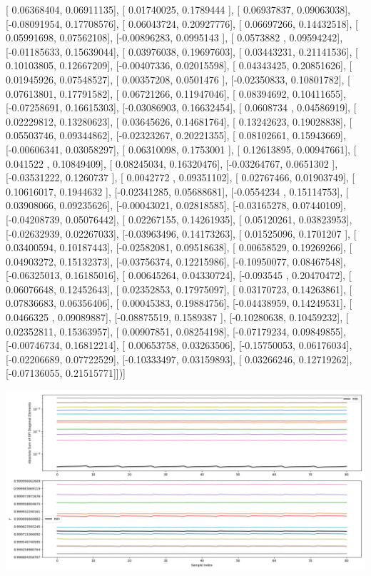 \documentclass{article}
\begin{document}
       [ 0.06368404,  0.06911135],
       [ 0.01740025,  0.1789444 ],
       [ 0.06937837,  0.09063038],
       [-0.08091954,  0.17708576],
       [ 0.06043724,  0.20927776],
       [ 0.06697266,  0.14432518],
       [ 0.05991698,  0.07562108],
       [-0.00896283,  0.0995143 ],
       [ 0.0573882 ,  0.09594242],
       [-0.01185633,  0.15639044],
       [ 0.03976038,  0.19697603],
       [ 0.03443231,  0.21141536],
       [ 0.10103805,  0.12667209],
       [-0.00407336,  0.02015598],
       [ 0.04343425,  0.20851626],
       [ 0.01945926,  0.07548527],
       [ 0.00357208,  0.0501476 ],
       [-0.02350833,  0.10801782],
       [ 0.07613801,  0.17791582],
       [ 0.06721266,  0.11947046],
       [ 0.08394692,  0.10411655],
       [-0.07258691,  0.16615303],
       [-0.03086903,  0.16632454],
       [ 0.0608734 ,  0.04586919],
       [ 0.02229812,  0.13280623],
       [ 0.03645626,  0.14681764],
       [ 0.13242623,  0.19028838],
       [ 0.05503746,  0.09344862],
       [-0.02323267,  0.20221355],
       [ 0.08102661,  0.15943669],
       [-0.00606341,  0.03058297],
       [ 0.06310098,  0.1753001 ],
       [ 0.12613895,  0.00947661],
       [ 0.041522  ,  0.10849409],
       [ 0.08245034,  0.16320476],
       [-0.03264767,  0.0651302 ],
       [-0.03531222,  0.1260737 ],
       [ 0.0042772 ,  0.09351102],
       [ 0.02767466,  0.01903749],
       [ 0.10616017,  0.1944632 ],
       [-0.02341285,  0.05688681],
       [-0.0554234 ,  0.15114753],
       [ 0.03908066,  0.09235626],
       [-0.00043021,  0.02818585],
       [-0.03165278,  0.07440109],
       [-0.04208739,  0.05076442],
       [ 0.02267155,  0.14261935],
       [ 0.05120261,  0.03823953],
       [-0.02632939,  0.02267033],
       [-0.03963496,  0.14173263],
       [ 0.01525096,  0.1701207 ],
       [ 0.03400594,  0.10187443],
       [-0.02582081,  0.09518638],
       [ 0.00658529,  0.19269266],
       [ 0.04903272,  0.15132373],
       [-0.03756374,  0.12215986],
       [-0.10950077,  0.08467548],
       [-0.06325013,  0.16185016],
       [ 0.00645264,  0.04330724],
       [-0.093545  ,  0.20470472],
       [ 0.06076648,  0.12452643],
       [ 0.02352853,  0.17975097],
       [ 0.03170723,  0.14263861],
       [ 0.07836683,  0.06356406],
       [ 0.00045383,  0.19884756],
       [-0.04438959,  0.14249531],
       [ 0.0466325 ,  0.09089887],
       [-0.08875519,  0.1589387 ],
       [-0.10280638,  0.10459232],
       [ 0.02352811,  0.15363957],
       [ 0.00907851,  0.08254198],
       [-0.07179234,  0.09849855],
       [-0.00746734,  0.16812214],
       [ 0.00653758,  0.03263506],
       [-0.15750053,  0.06176034],
       [-0.02206689,  0.07722529],
       [-0.10333497,  0.03159893],
       [ 0.03266246,  0.12719262],
       [-0.07136055,  0.21515771]])]
\begin{center}
\includegraphics[scale=.9]{report_pickled_controls170/control_dpn_all.png}

\end{center}
\end{document}
